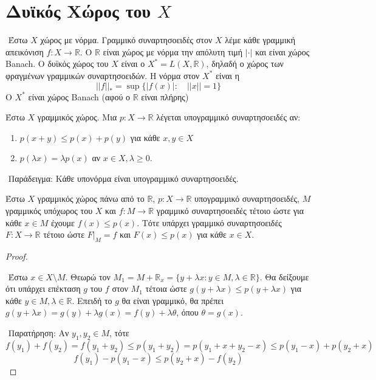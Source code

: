 \pagebreak

\section{Δυϊκός Χώρος του $X$}

$ $\newline
Έστω $X$ χώρος με νόρμα. Γραμμικό συναρτησοειδές στον $X$ λέμε κάθε γραμμική απεικόνιση $f: X \rightarrow \mathbb R$. Ο $\mathbb{R}$ είναι χώρος με νόρμα την απόλυτη τιμή $|\cdot |$ και είναι χώρος {\eng Banach}. Ο δυϊκός χώρος του $X$ είναι ο $X^* = L(X,\mathbb R)$, δηλαδή ο χώρος των φραγμένων γραμμικών συναρτησοειδών. Η νόρμα στον $X^*$ είναι η 
$$||f||_* = \sup \{ |f(x)|: \quad ||x|| = 1\}$$ Ο $X^*$ είναι χώρος {\eng Banach} (αφού ο $\mathbb R$ είναι πλήρης)

\begin{definition}
    Έστω $X$ γραμμικός χώρος. Μια $p : X \rightarrow \mathbb R$ λέγεται υπογραμμικό συναρτησοειδές αν:
    \begin{enumerate}
        \item $p(x+y) \leq p(x) + p(y)$ για κάθε $x,y \in X$
        \item $p(\lambda x) = \lambda p(x)$ αν $x \in X, \lambda \geq 0$.
    \end{enumerate}
\end{definition}

$ $\newline
Παράδειγμα: Κάθε υπονόρμα είναι υπογραμμικό συναρτησοειδές.

\begin{theorem}
    Έστω $X$ γραμμικός χώρος πάνω από το $\mathbb R$, $p: X \rightarrow \mathbb R$ υπογραμμικό συναρτησοειδές, $M$ γραμμικός υπόχωρος του $X$ και $f: M \rightarrow \mathbb R$ γραμμικό συναρτησοειδές τέτοιο ώστε για κάθε $x \in M$ έχουμε $f(x) \leq p(x)$. Τότε υπάρχει γραμμικό συναρτησοειδές $F:X \rightarrow \mathbb R$ τέτοιο ώστε $F|_M = f$ και $F(x) \leq p(x)$ για κάθε $x \in X$.
\end{theorem}

\begin{proof} $ $

    $ $\newline
    Έστω $x \in X\setminus M$. Θεωρώ τον $M_1=  M + \mathbb R_x = \{ y + \lambda x: y \in M, \lambda \in \mathbb R\}$. Θα δείξουμε ότι υπάρχει επέκταση $g$ του $f$ στον $M_1$ τέτοια ώστε $g(y+\lambda x) \leq p(y+\lambda x)$ για κάθε $y \in M, \lambda \in \mathbb R$. Επειδή το $g$ θα είναι γραμμικό, θα πρέπει $g(y+\lambda x) = g(y) + \lambda g(x) = f(y) + \lambda \theta$, όπου $\theta = g(x)$.

    $ $\newline
    Παρατήρηση: Αν $y_1,y_2 \in M$, τότε
    $$f(y_1) + f(y_2) = f(y_1+y_2) \leq p(y_1+y_2) = p(y_1+x + y_2 - x) \leq p(y_1 - x) + p(y_2 + x)$$
    $$f(y_1) - p(y_1-x) \leq p(y_2 + x) - f(y_2)$$


    
\end{proof}